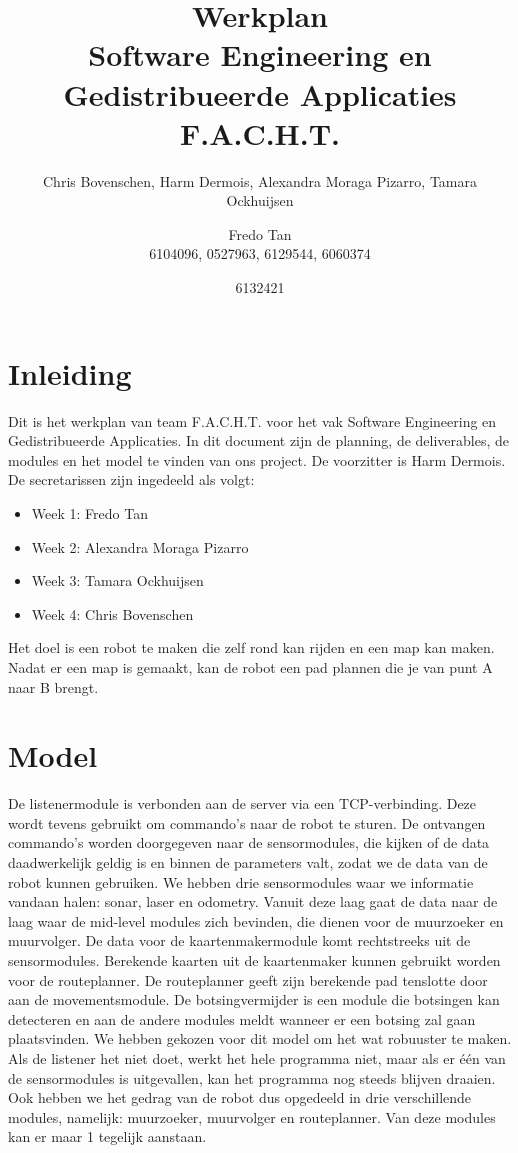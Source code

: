 \documentclass[a4paper,10pt]{article}
\title{Werkplan\\\small Software Engineering en Gedistribueerde Applicaties\\\small F.A.C.H.T.}
\author{Chris Bovenschen, Harm Dermois, Alexandra Moraga Pizarro, Tamara Ockhuijsen \and Fredo Tan\\\small 6104096, 0527963, 6129544, 6060374\and 6132421}
\begin{document}
\maketitle
\tableofcontents
\section{Inleiding}
Dit is het werkplan van team F.A.C.H.T. voor het vak Software Engineering en Gedistribueerde
Applicaties. In dit document zijn de planning, de deliverables, de modules en het model te vinden van ons project. De voorzitter is Harm Dermois. De secretarissen zijn ingedeeld als volgt:
\begin{itemize}
\item Week 1: Fredo Tan
\item Week 2: Alexandra Moraga Pizarro
\item Week 3: Tamara Ockhuijsen
\item Week 4: Chris Bovenschen
\end{itemize}
Het doel is een robot te maken die zelf rond kan rijden en een map kan maken. Nadat er een map is gemaakt, kan de robot een pad plannen die je van punt A naar B brengt.
\section{Model}
De listenermodule is verbonden aan de server via een TCP-verbinding. Deze wordt tevens gebruikt om commando's naar de robot te sturen. De ontvangen commando's worden doorgegeven naar de sensormodules, die kijken of de data daadwerkelijk geldig is en binnen de parameters valt, zodat we de data van de robot kunnen gebruiken. We hebben drie sensormodules waar we informatie vandaan halen: sonar, laser en odometry. Vanuit deze laag gaat de data naar de laag waar de mid-level modules zich bevinden, die dienen voor de muurzoeker en muurvolger. De data voor de kaartenmakermodule komt rechtstreeks uit de sensormodules. Berekende kaarten uit de kaartenmaker kunnen gebruikt worden voor de routeplanner. De routeplanner geeft zijn berekende pad tenslotte door aan de movementsmodule. De botsingvermijder is een module die botsingen kan detecteren en aan de andere modules meldt wanneer er een botsing zal gaan plaatsvinden.
We hebben gekozen voor dit model om het wat robuuster te maken. Als de listener het niet doet, werkt het hele programma niet, maar als er \'{e}\'{e}n van de sensormodules is uitgevallen, kan het programma
nog steeds blijven draaien. Ook hebben we het gedrag van de robot dus opgedeeld in drie verschillende modules, namelijk: muurzoeker, muurvolger en routeplanner. Van deze modules kan er maar 1 tegelijk aanstaan. 
\end{document}
